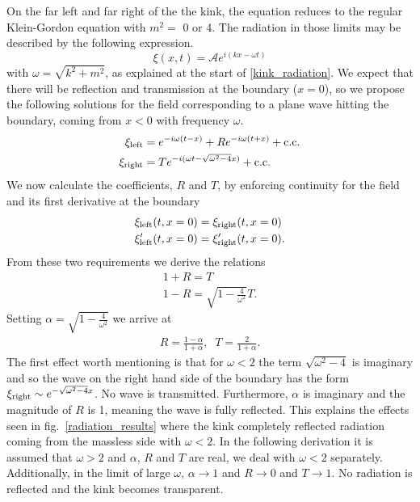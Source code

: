 \documentclass[11pt, oneside]{article}  	%
\numberwithin{equation}{section}
\begin{document}
On the far left and far right of the the kink, the equation reduces to the regular Klein-Gordon equation with $m^2 = $ 0 or 4. The radiation in those limits may be described by the following expression.
\begin{equation}
\xi(x,t) = \mathcal{A}e^{i(kx-\omega t)}
\end{equation}
with $\omega = \sqrt{k^2 + m^2}$, as explained at the start of \textsection \ref{kink_radiation}. We expect that there will be reflection and transmission at the boundary ($x=0$), so we propose the following solutions for the field corresponding to a plane wave hitting the boundary, coming from $x<0$ with frequency $\omega$.
\begin{align}
\xi_\textup{left} &= e^{-i\omega (t-x)} + Re^{-i\omega (t+x)} + \textup{c.c.} \label{wave_left}\\
\xi_\textup{right} &= T e^{-i(\omega t-\sqrt{\omega^2 - 4}x)} + \textup{c.c.} \label{wave_right}
\end{align}
We now calculate the coefficients, $R$ and $T$, by enforcing continuity for the field and its first derivative at the boundary
\begin{align}
\xi_\textup{left}(t,x=0) &= \xi_\textup{right}(t,x=0) \label{cont1}\\
\xi'_\textup{left}(t,x=0) &= \xi'_\textup{right}(t,x=0). \label{cont2}
\end{align}
From these two requirements we derive the relations
\begin{align}
1+R = T\\
1-R = \sqrt{1-\frac{4}{\omega^2}}T.
\end{align}
Setting $\alpha = \sqrt{1-\frac{4}{\omega^2}}$ we arrive at
\begin{align} \label{RT}
R = \frac{1-\alpha}{1+\alpha}, \;\; T = \frac{2}{1+\alpha}.
\end{align}
The first effect worth mentioning is that for $\omega < 2$ the term $\sqrt{\omega^2 - 4}$ is imaginary and so the wave on the right hand side of the boundary has the form $ \xi_\textup{right} \sim e^{-\sqrt{\omega^2 - 4}x}$. No wave is transmitted. Furthermore, $\alpha$ is imaginary and the magnitude of $R$ is 1, meaning the wave is fully reflected. This explains the effects seen in fig.~\ref{radiation_results} where the kink completely reflected radiation coming from the massless side with $\omega < 2$. In the following derivation it is assumed that $\omega> 2$ and $\alpha$, $R$ and $T$ are real, we deal with $\omega< 2$ separately. Additionally, in the limit of large $\omega$, $\alpha \rightarrow 1$ and $R\rightarrow0$ and $T \rightarrow 1$. No radiation is reflected and the kink becomes transparent.\par
\end{document}
